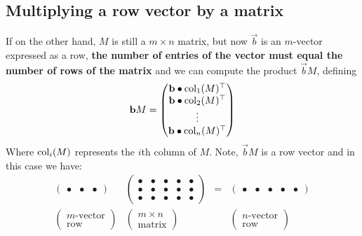 \documentclass{ximera}
\begin{document}
\subsection{Multiplying a row vector by a matrix}
If on the other hand, $M$ is still a $m\times n$ matrix, but now
$\vec{b}$ is an $m$-vector expressed as a row, \textbf{the number of
  entries of the vector must equal the number of rows of the matrix}
and we can compute the product $\vec{b}M$, defining
\[
  \mathbf{b} M =
  \begin{pmatrix}
    \mathbf{b}\bullet \operatorname{col}_1(M)^\top \\
    \mathbf{b}\bullet \operatorname{col}_2(M)^\top \\
    \vdots \\
    \mathbf{b}\bullet \operatorname{col}_n(M)^\top
  \end{pmatrix}
\]
Where $\operatorname{col}_i(M)$ represents the $i$th column of $M$. Note, $\vec{b}M$ is a row vector and in this case we have:
\[
  \begin{matrix}
    \begin{pmatrix}
      \bullet & \bullet & \bullet
    \end{pmatrix}
    &
      \begin{pmatrix}
        \bullet & \bullet & \bullet & \bullet & \bullet \\
        \bullet & \bullet & \bullet & \bullet & \bullet \\
        \bullet & \bullet & \bullet & \bullet & \bullet
      \end{pmatrix}
    &
      =
    &
      \begin{pmatrix}
        \bullet & \bullet & \bullet & \bullet & \bullet
      \end{pmatrix}
    \\
    \begin{pmatrix}
      m\text{-vector}\\
      \text{row}
    \end{pmatrix}
    &
      \begin{pmatrix}
        m\times n\\
        \text{matrix}
      \end{pmatrix}
    & &
        \begin{pmatrix}
          n\text{-vector}\\
          \text{row}
        \end{pmatrix}
  \end{matrix}
\]
\end{document}
